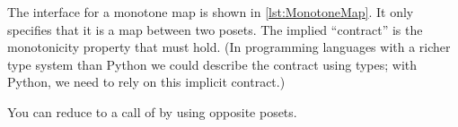 
The interface for a monotone map is shown in \cref{lst:MonotoneMap}.
It only specifies that it is a map between two posets.
The implied ``contract'' is the monotonicity property that must hold.
(In programming languages with a richer type system than Python we could describe the contract using types; with Python, we need to rely on this implicit contract.)


\begin{widepar}
\end{widepar}

\begin{hint}
    You can reduce  to a call of  by using opposite posets.
\end{hint}
